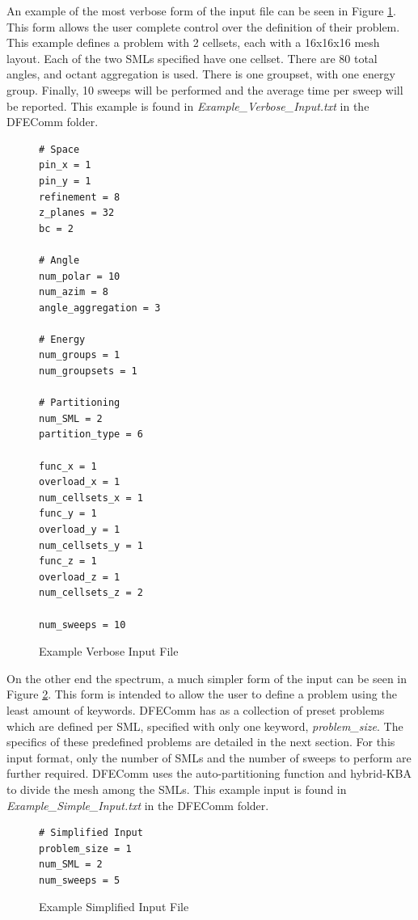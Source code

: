 \documentclass{article}
\begin{document}
An example of the most verbose form of the input file can be seen in Figure \ref{fig::verbose}. This form allows the user complete control over the definition of their problem. This example defines a problem with 2 cellsets, each with a 16x16x16 mesh layout. Each of the two SMLs specified have one cellset. There are 80 total angles, and octant aggregation is used. There is one groupset, with one energy group. Finally, 10 sweeps will be performed and the average time per sweep will be reported. This example is found in \emph{Example\_Verbose\_Input.txt} in the DFEComm folder.\\
\begin{figure}[H]
\begin{verbatim}
# Space
pin_x = 1
pin_y = 1
refinement = 8
z_planes = 32
bc = 2

# Angle
num_polar = 10
num_azim = 8
angle_aggregation = 3

# Energy
num_groups = 1
num_groupsets = 1
  	
# Partitioning
num_SML = 2
partition_type = 6
  	
func_x = 1
overload_x = 1
num_cellsets_x = 1
func_y = 1
overload_y = 1
num_cellsets_y = 1
func_z = 1
overload_z = 1
num_cellsets_z = 2

num_sweeps = 10
\end{verbatim}
  \caption[]{Example Verbose Input File}\label{fig::verbose}
\end{figure}

On the other end the spectrum, a much simpler form of the input can be seen in Figure \ref{fig::simplified}. This form is intended to allow the user to define a problem using the least amount of keywords. DFEComm has as a collection of preset problems which are defined per SML, specified with only one keyword, \emph{problem\_size}. The specifics of these predefined problems are detailed in the next section. For this input format, only the number of SMLs and the number of sweeps to perform are further required. DFEComm uses the auto-partitioning function and hybrid-KBA to divide the mesh among the SMLs. This example input is found in \emph{Example\_Simple\_Input.txt} in the DFEComm folder.\\

\begin{figure}[H]
\begin{verbatim}
# Simplified Input
problem_size = 1
num_SML = 2
num_sweeps = 5
\end{verbatim}  
    \caption[]{Example Simplified Input File}\label{fig::simplified}
\end{figure}
\end{document}
